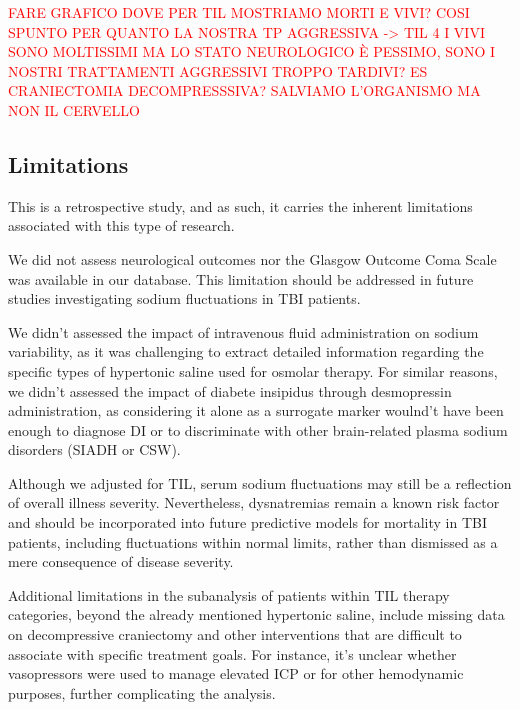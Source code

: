 \textcolor{red}{FARE GRAFICO DOVE PER TIL MOSTRIAMO MORTI E VIVI? COSI SPUNTO PER QUANTO LA NOSTRA TP AGGRESSIVA -> TIL 4 I VIVI SONO MOLTISSIMI MA LO STATO NEUROLOGICO È PESSIMO, SONO I NOSTRI TRATTAMENTI AGGRESSIVI TROPPO TARDIVI? ES CRANIECTOMIA DECOMPRESSSIVA? SALVIAMO L'ORGANISMO MA NON IL CERVELLO}
\\



\subsection{Limitations}
This is a retrospective study, and as such, it carries the inherent limitations associated with this type of research.

We did not assess neurological outcomes nor the Glasgow Outcome Coma Scale was available in our database. This limitation should be addressed in future studies investigating sodium fluctuations in TBI patients.

We didn't assessed the impact of intravenous fluid administration on sodium variability, as it was challenging to extract detailed information regarding the specific types of hypertonic saline\cite{holdenHypertonicSalineUse2023a} used for osmolar therapy.
For similar reasons, we didn't assessed the impact of diabete insipidus through desmopressin administration, as considering it alone as a surrogate marker woulnd't have been enough to diagnose DI or to discriminate with other brain-related plasma sodium disorders (SIADH or CSW). 

Although we adjusted for TIL, serum sodium fluctuations may still be a reflection of overall illness severity. Nevertheless, dysnatremias remain a known risk factor and should be incorporated into future predictive models for mortality in TBI patients, including fluctuations within normal limits, rather than dismissed as a mere consequence of disease severity.

Additional limitations in the subanalysis of patients within TIL therapy categories, beyond the already mentioned hypertonic saline, include missing data on decompressive craniectomy\cite{kimRecentUpdatesControversies2023a} and other interventions that are difficult to associate with specific treatment goals. For instance, it’s unclear whether vasopressors were used to manage elevated ICP or for other hemodynamic purposes, further complicating the analysis.

